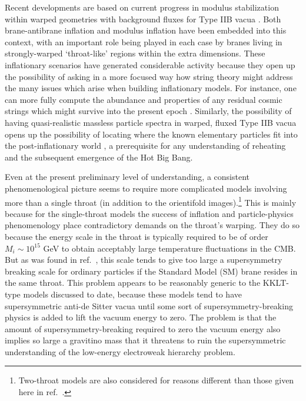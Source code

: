 \documentclass[12pt]{JHEP3}
\begin{document}
Recent developments are based on current progress in
modulus stabilization within warped geometries with background
fluxes for Type IIB vacua \cite{GKP,Sethi,kklt}. Both
brane-antibrane inflation \cite{kklmmt} and modulus inflation
\cite{racetrackinflation} have been embedded into this context,
with an important role being played in each case by branes living
in strongly-warped `throat-like' regions within the extra
dimensions. These inflationary scenarios have generated
considerable activity \cite{OtherStringInflation,BIReviews}
because they open up the possibility of asking in a more focused
way how string theory might address the many issues which arise
when building inflationary models. For instance, one can more
fully compute the abundance and properties of any residual cosmic
strings which might survive into the present epoch
\cite{stringycosmicstrings}. Similarly, the possibility of having
quasi-realistic massless particle spectra in warped, fluxed Type
IIB vacua \cite{cmqu} opens up the possibility of locating where
the known elementary particles fit into the post-inflationary
world \cite{bcqs}, a prerequisite for any understanding of
reheating and the subsequent emergence of the Hot Big Bang.

Even at the present preliminary level of understanding, a
consistent phenomenological picture seems to require more
complicated models involving more than a single throat (in
addition to the orientifold images).\footnote{Two-throat models
are also considered for reasons different than those given here in
ref.~\cite{twothroat}.} This is mainly because for the
single-throat models the success of inflation and particle-physics
phenomenology place contradictory demands on the throat's warping.
They do so because the energy scale in the throat is typically
required to be of order $M_i \sim 10^{15}$ GeV to obtain
acceptably large temperature fluctuations in the CMB. But as was
found in ref.~\cite{bcqs}, this scale tends to give too large a
supersymmetry breaking scale for ordinary particles if the
Standard Model (SM) brane resides in the same throat. This problem
appears to be reasonably generic to the KKLT-type models discussed
to date, because these models tend to have supersymmetric anti-de
Sitter vacua until some sort of supersymmetry-breaking physics is
added to lift the vacuum energy to zero. The problem is that the
amount of supersymmetry-breaking required to zero the vacuum
energy also implies so large a gravitino mass that it threatens to
ruin the supersymmetric understanding of the low-energy
electroweak hierarchy problem.
\end{document}
